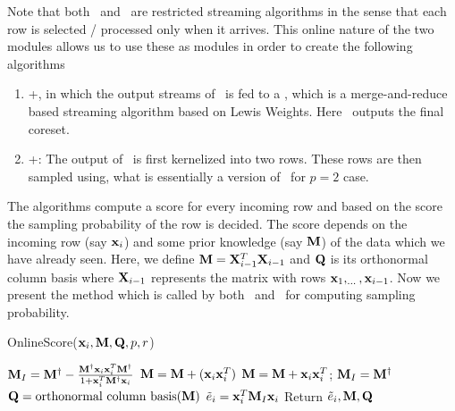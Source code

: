 Note that both \online~and ~are restricted streaming algorithms in the sense that each row is selected / processed only when it arrives. This online nature of the two modules allows us to use these as modules in order to create the following algorithms 
\begin{enumerate}
    \item \online+\mrlw, in which the output streams of \online~is fed to a \mrlw, which is a merge-and-reduce based streaming algorithm based on Lewis Weights. Here \mrlw~outputs the final coreset. 
    \item \online+: The output of \online~is first kernelized into two rows. These rows are then sampled using, what is essentially a version of \online~for $p=2$ case. 
\end{enumerate}
The algorithms compute a score for every incoming row and based on the score the sampling probability of the row is decided. The score depends on the incoming row (say $\mathbf{x}_{i}$) and some prior knowledge (say $\mathbf{M}$) of the data which we have already seen. Here, we define $\mathbf{M} = \mathbf{X}_{i-1}^{T}\mathbf{X}_{i-1}$ and $\mathbf{Q}$ is its orthonormal column basis where $\mathbf{X}_{i-1}$ represents the matrix with rows $\mathbf{x}_{1},_{\ldots},\mathbf{x}_{i-1}$. Now we present the method which is called by both \online~and ~for computing sampling probability.
% 
\begin{algorithm}[htpb]
\caption{OnlineScore($\mathbf{x}_{i}, \mathbf{M}, \mathbf{Q}, p, r$)}{\label{alg:onineScore}}
\begin{algorithmic}
\STATE $\mathbf{M}_{I} = \mathbf{M}^{\dagger} - \frac{\mathbf{M}^{\dagger}\mathbf{x}_{i}\mathbf{x}_{i}^{T}\mathbf{M}^{\dagger}}{1+\mathbf{x}_{i}^{T}\mathbf{M}^{\dagger}\mathbf{x}_{i}}$ 
\STATE $\mathbf{M} = \mathbf{M} + (\mathbf{x}_{i}\mathbf{x}_{i}^T)$ \;
\ELSE
\STATE $\mathbf{M} = \mathbf{M} + \mathbf{x}_{i}\mathbf{x}_{i}^{T}$; $\mathbf{M}_{I} = \mathbf{M}^{\dagger}$
\STATE $\mathbf{Q} = \mbox{orthonormal column basis}(\mathbf{M})$
\ENDIF
\STATE $\tilde{e}_{i} = \mathbf{x}_{i}^T\mathbf{M}_{I}\mathbf{x}_{i}$
\STATE Return $\tilde{e}_{i},\mathbf{M},\mathbf{Q}$
\end{algorithmic}
\end{algorithm}

